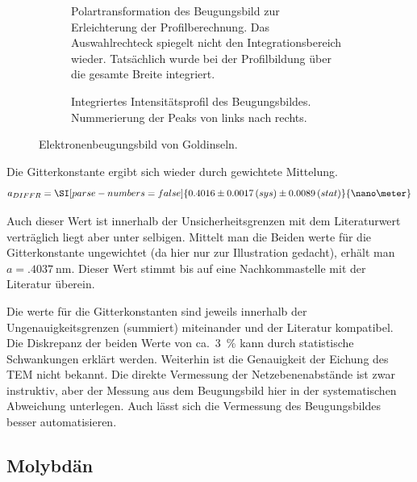 \documentclass[slug=TEM, room=IFW, supervisor=?, coursedate=23.\ 01.\ 2020]{../../Lab_Report_LaTeX/lab_report}
\begin{document}
\begin{figure}[hp]
\begin{subfigure}{.4\textwidth}
    \caption{Polartransformation des Beugungsbild zur Erleichterung
      der Profilberechnung. Das Auswahlrechteck spiegelt nicht den
      Integrationsbereich wieder. Tats\"achlich wurde bei der
      Profilbildung \"uber die gesamte Breite integriert.}%
    \label{fig:ebeug_plolar}
  \end{subfigure}
  \begin{subfigure}{\textwidth}
    \centering \resizebox{1\textwidth}{!}{%
      }
    \caption{Integriertes Intensit\"atsprofil des
      Beugungsbildes. Nummerierung der Peaks von links nach rechts.}%
    \label{fig:gold_diffr-profile}
  \end{subfigure}
  \caption{Elektronenbeugungsbild von Goldinseln.}
  \label{fig:ebeug}
\end{figure}

Die Gitterkonstante ergibt sich wieder durch gewichtete Mittelung.
\begin{equation}
  \label{eq:ahrtem}
  a_{DIFFR} = \SI[parse-numbers=false]{0.4016\pm 0.0017\,(sys)\pm 0.0089\,(stat)}{\nano\meter}
\end{equation}

Auch dieser Wert ist innerhalb der Unsicherheitsgrenzen mit dem
Literaturwert vertr\"aglich liegt aber unter selbigen. Mittelt man die
Beiden werte f\"ur die Gitterkonstante ungewichtet (da hier nur zur
Illustration gedacht), erhält man
\(a=\SI{.4037}{\nano\meter}\). Dieser Wert stimmt bis auf eine
Nachkommastelle mit der Literatur \"uberein.

Die werte f\"ur die Gitterkonstanten sind jeweils innerhalb der
Ungenauigkeitsgrenzen (summiert) miteinander und der Literatur
kompatibel. Die Diskrepanz der beiden Werte von ca.~\SI{3}{\percent}
kann durch statistische Schwankungen erkl\"art werden. Weiterhin ist
die Genauigkeit der Eichung des TEM nicht bekannt. Die direkte
Vermessung der Netzebenenabst\"ande ist zwar instruktiv, aber der
Messung aus dem Beugungsbild hier in der systematischen Abweichung
unterlegen. Auch l\"asst sich die Vermessung des Beugungsbildes besser
automatisieren.

\subsection{Molybdän}

\end{document}

